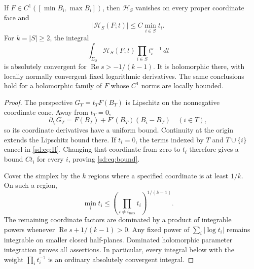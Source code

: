 \begin{lemma}
\label{sd:lem:boundary}
If $F\in C^1([\min B_i,\max B_i])$, then $\mathcal H_S$ vanishes
on every proper coordinate face and
\begin{equation}\label{sd:eq:bound}
 |\mathcal H_S(F;t)|\le C\min_{i\in S}t_i.
\end{equation}
For $k=|S|\ge2$, the integral
\begin{equation}\label{sd:eq:integralhol}
 \int_{\Sigma_S}\mathcal H_S(F;t)
                            \prod_{i\in S}t_i^{s-1}\,dt
\end{equation}
is absolutely convergent for $\operatorname{Re}s>-1/(k-1)$.
It is holomorphic there, with locally normally convergent fixed
logarithmic derivatives.  The same conclusions hold for a holomorphic
family of $F$ whose $C^1$ norms are locally bounded.
\end{lemma}
\begin{proof}
The perspective $G_T=t_TF(B_T)$ is Lipschitz on the nonnegative
coordinate cone.  Away from $t_T=0$,
\[
 \partial_{t_i}G_T=F(B_T)+F'(B_T)(B_i-B_T)\quad(i\in T),
\]
so its coordinate derivatives have a uniform bound.  Continuity at the
origin extends the Lipschitz bound there.  If $t_i=0$, the terms indexed
by $T$ and $T\cup\{i\}$ cancel in \eqref{sd:eq:H}.  Changing that
coordinate from zero to $t_i$ therefore gives a bound $Ct_i$ for
every $i$, proving \eqref{sd:eq:bound}.

Cover the simplex by the $k$ regions where a specified coordinate is
at least $1/k$.  On such a region,
\[
 \min_i t_i\le
        \left(\prod_{i\ne i_{\max}}t_i\right)^{1/(k-1)}.
\]
The remaining coordinate factors are dominated by a product of
integrable powers whenever $\operatorname{Re}s+1/(k-1)>0$.
Any fixed power of $\sum_i|\log t_i|$ remains integrable on smaller
closed half-planes.  Dominated holomorphic parameter integration proves
all assertions.  In particular, every integral below with the weight
$\prod_i t_i^{-1}$ is an ordinary absolutely convergent integral.
\end{proof}

